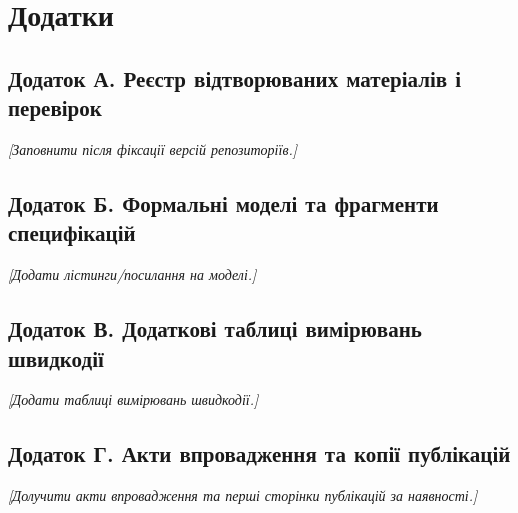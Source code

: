 
\appendix
\chapter*{Додатки}

\section*{Додаток А. Реєстр відтворюваних матеріалів і перевірок}
\emph{[Заповнити після фіксації версій репозиторіїв.]}

\section*{Додаток Б. Формальні моделі та фрагменти специфікацій}
\emph{[Додати лістинги/посилання на моделі.]}

\section*{Додаток В. Додаткові таблиці вимірювань швидкодії}
\emph{[Додати таблиці вимірювань швидкодії.]}

\section*{Додаток Г. Акти впровадження та копії публікацій}
\emph{[Долучити акти впровадження та перші сторінки публікацій за наявності.]}
